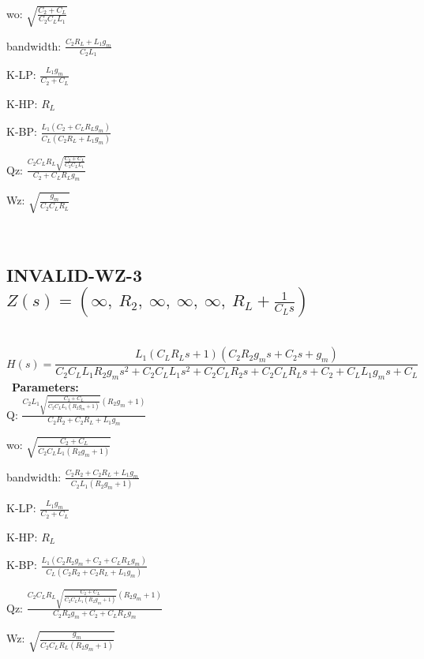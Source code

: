 \documentclass{article}
\begin{document}
wo: $\sqrt{\frac{C_{2} + C_{L}}{C_{2} C_{L} L_{1}}}$\ 

bandwidth: $\frac{C_{2} R_{L} + L_{1} g_{m}}{C_{2} L_{1}}$\ 

K-LP: $\frac{L_{1} g_{m}}{C_{2} + C_{L}}$\ 

K-HP: $R_{L}$\ 

K-BP: $\frac{L_{1} \left(C_{2} + C_{L} R_{L} g_{m}\right)}{C_{L} \left(C_{2} R_{L} + L_{1} g_{m}\right)}$\ 

Qz: $\frac{C_{2} C_{L} R_{L} \sqrt{\frac{C_{2} + C_{L}}{C_{2} C_{L} L_{1}}}}{C_{2} + C_{L} R_{L} g_{m}}$\ 

Wz: $\sqrt{\frac{g_{m}}{C_{2} C_{L} R_{L}}}$\ 

\ 

\subsection{INVALID-WZ-3 $Z(s) = \left( \infty, \  R_{2}, \  \infty, \  \infty, \  \infty, \  R_{L} + \frac{1}{C_{L} s}\right)$ } \ 
\textbf{\[H(s) = \frac{L_{1} \left(C_{L} R_{L} s + 1\right) \left(C_{2} R_{2} g_{m} s + C_{2} s + g_{m}\right)}{C_{2} C_{L} L_{1} R_{2} g_{m} s^{2} + C_{2} C_{L} L_{1} s^{2} + C_{2} C_{L} R_{2} s + C_{2} C_{L} R_{L} s + C_{2} + C_{L} L_{1} g_{m} s + C_{L}}\] } \ 
\textbf{Parameters:}\\ 

Q: $\frac{C_{2} L_{1} \sqrt{\frac{C_{2} + C_{L}}{C_{2} C_{L} L_{1} \left(R_{2} g_{m} + 1\right)}} \left(R_{2} g_{m} + 1\right)}{C_{2} R_{2} + C_{2} R_{L} + L_{1} g_{m}}$\ 

wo: $\sqrt{\frac{C_{2} + C_{L}}{C_{2} C_{L} L_{1} \left(R_{2} g_{m} + 1\right)}}$\ 

bandwidth: $\frac{C_{2} R_{2} + C_{2} R_{L} + L_{1} g_{m}}{C_{2} L_{1} \left(R_{2} g_{m} + 1\right)}$\ 

K-LP: $\frac{L_{1} g_{m}}{C_{2} + C_{L}}$\ 

K-HP: $R_{L}$\ 

K-BP: $\frac{L_{1} \left(C_{2} R_{2} g_{m} + C_{2} + C_{L} R_{L} g_{m}\right)}{C_{L} \left(C_{2} R_{2} + C_{2} R_{L} + L_{1} g_{m}\right)}$\ 

Qz: $\frac{C_{2} C_{L} R_{L} \sqrt{\frac{C_{2} + C_{L}}{C_{2} C_{L} L_{1} \left(R_{2} g_{m} + 1\right)}} \left(R_{2} g_{m} + 1\right)}{C_{2} R_{2} g_{m} + C_{2} + C_{L} R_{L} g_{m}}$\ 

Wz: $\sqrt{\frac{g_{m}}{C_{2} C_{L} R_{L} \left(R_{2} g_{m} + 1\right)}}$\ 

\ 
\end{document}

